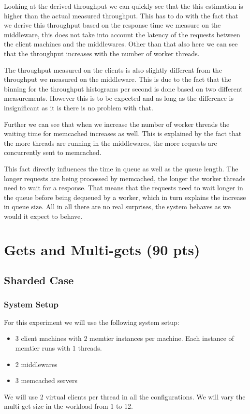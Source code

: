 \documentclass[11pt,a4paper]{article}
\begin{document}
%
\par
%
Looking at the derived throughput we can quickly see that the this estimation is higher than the actual measured throughput.
%
This has to do with the fact that we derive this throughput based on the response time we measure on the middleware, this does not take into account the latency of the requests between the client machines and the middlewares.
%
Other than that also here we can see that the throughput increases with the number of worker threads.
%
\par
%
The throughput measured on the clients is also slightly different from the throughput we measured on the middleware. 
%
This is due to the fact that the binning for the throughput histograms per second is done based on two different measurements.
%
However this is to be expected and as long as the difference is insignificant as it is there is no problem with that.
%
\par
%
Further we can see that when we increase the number of worker threads the waiting time for memcached increases as well.
%
This is explained by the fact that the more threads are running in the middlewares, the more requests are concurrently sent to memcached.
%
\par
%
This fact directly influences the time in queue as well as the queue length.
%
The longer requests are being processed by memcached, the longer the worker threads need to wait for a response.
%
That means that the requests need to wait longer in the queue before being dequeued by a worker, which in turn explains the increase in queue size.
%
All in all there are no real surprises, the system behaves as we would it expect to behave.

\section{Gets and Multi-gets (90 pts)}
%
\subsection{Sharded Case}
%
\subsubsection{System Setup}
%
For this experiment we will use the following system setup:
%
\begin{itemize}
	\item 3 client machines with 2 memtier instances per machine. Each instance of memtier runs with 1 threads.
	\item 2 middlewares
	\item 3 memcached servers
\end{itemize}
%
We will use 2 virtual clients per thread in all the configurations.
%
We will vary the multi-get size in the workload from 1 to 12.
%
\end{document}
